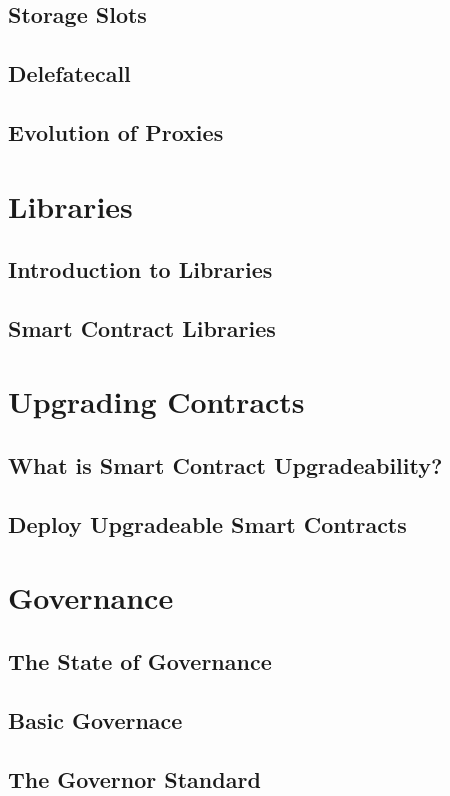\documentclass[a4paper, oneside]{book}
\begin{document}
\subsection{Storage Slots}
\subsection{Delefatecall}
\subsection{Evolution of Proxies}

\section{Libraries}
\subsection{Introduction to Libraries}
\subsection{Smart Contract Libraries}

\section{Upgrading Contracts}
\subsection{What is Smart Contract Upgradeability?}
\subsection{Deploy Upgradeable Smart Contracts}

\section{Governance}
\subsection{The State of Governance}
\subsection{Basic Governace}
\subsection{The Governor Standard}
\end{document}
